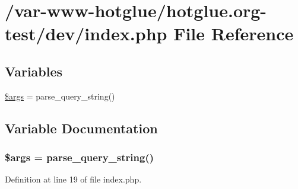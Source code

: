 \hypertarget{index_8php}{
\section{/var-\/www-\/hotglue/hotglue.org-\/test/dev/index.php File Reference}
\label{index_8php}
}
\subsection*{Variables}
\begin{DoxyCompactItemize}
\item 
\hyperlink{index_8php_a67e94494731d99ed23b123e95175bc10}{\$args} = parse\_\-query\_\-string()
\end{DoxyCompactItemize}


\subsection{Variable Documentation}
\hypertarget{index_8php_a67e94494731d99ed23b123e95175bc10}{
\subsubsection[{\$args}]{\setlength{\rightskip}{0pt plus 5cm}\$args = parse\_\-query\_\-string()}}
\label{index_8php_a67e94494731d99ed23b123e95175bc10}


Definition at line 19 of file index.php.

